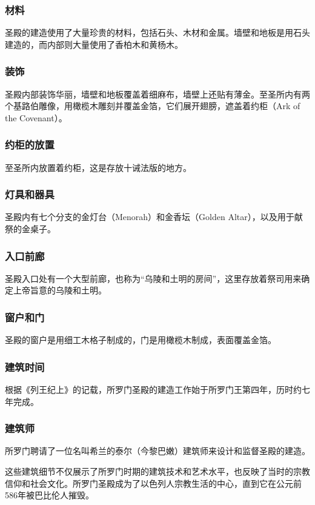 \documentclass[12pt, a4paper]{ctexart}
\begin{document}
\subsubsection{材料}
圣殿的建造使用了大量珍贵的材料，包括石头、木材和金属。墙壁和地板是用石头建造的，而内部则大量使用了香柏木和黄杨木。

\subsubsection{装饰}
圣殿内部装饰华丽，墙壁和地板覆盖着细麻布，墙壁上还贴有薄金。至圣所内有两个基路伯雕像，用橄榄木雕刻并覆盖金箔，它们展开翅膀，遮盖着约柜（Ark of the Covenant）。

\subsubsection{约柜的放置}
至圣所内放置着约柜，这是存放十诫法版的地方。

\subsubsection{灯具和器具}
圣殿内有七个分支的金灯台（Menorah）和金香坛（Golden Altar），以及用于献祭的金桌子。

\subsubsection{入口前廊}
圣殿入口处有一个大型前廊，也称为“乌陵和土明的房间”，这里存放着祭司用来确定上帝旨意的乌陵和土明。

\subsubsection{窗户和门}
圣殿的窗户是用细工木格子制成的，门是用橄榄木制成，表面覆盖金箔。

\subsubsection{建筑时间}
根据《列王纪上》的记载，所罗门圣殿的建造工作始于所罗门王第四年，历时约七年完成。

\subsubsection{建筑师}
所罗门聘请了一位名叫希兰的泰尔（今黎巴嫩）建筑师来设计和监督圣殿的建造。

这些建筑细节不仅展示了所罗门时期的建筑技术和艺术水平，也反映了当时的宗教信仰和社会文化。所罗门圣殿成为了以色列人宗教生活的中心，直到它在公元前586年被巴比伦人摧毁。
\end{document}
